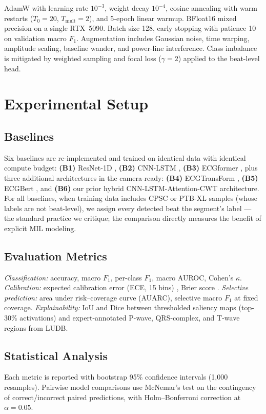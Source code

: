 \documentclass[conference]{IEEEtran}
\begin{document}
AdamW \cite{loshchilov2019} with learning rate $10^{-3}$, weight decay $10^{-4}$, cosine annealing with warm restarts ($T_0=20$, $T_{\text{mult}}=2$), and 5-epoch linear warmup. BFloat16 mixed precision on a single RTX~5090. Batch size 128, early stopping with patience 10 on validation macro $F_1$. Augmentation includes Gaussian noise, time warping, amplitude scaling, baseline wander, and power-line interference. Class imbalance is mitigated by weighted sampling and focal loss ($\gamma=2$) \cite{lin2017} applied to the beat-level head.

\section{Experimental Setup}

\subsection{Baselines}
Six baselines are re-implemented and trained on identical data with identical compute budget:
\textbf{(B1)} ResNet-1D \cite{hannun2019},
\textbf{(B2)} CNN-LSTM \cite{oh2018},
\textbf{(B3)} ECGformer \cite{ecgformer2024},
plus three additional architectures in the camera-ready: \textbf{(B4)} ECGTransForm \cite{ecgtransform2024}, \textbf{(B5)} ECGBert \cite{ecgbert2024}, and \textbf{(B6)} our prior hybrid CNN-LSTM-Attention-CWT architecture.
For all baselines, when training data includes CPSC or PTB-XL samples (whose labels are not beat-level), we assign every detected beat the segment's label --- the standard practice we critique; the comparison directly measures the benefit of explicit MIL modeling.

\subsection{Evaluation Metrics}
\textit{Classification:} accuracy, macro $F_1$, per-class $F_1$, macro AUROC, Cohen's $\kappa$.
\textit{Calibration:} expected calibration error (ECE, 15 bins) \cite{naeini2015}, Brier score \cite{brier1950}.
\textit{Selective prediction:} area under risk--coverage curve (AUARC), selective macro $F_1$ at fixed coverage.
\textit{Explainability:} IoU and Dice between thresholded saliency maps (top-30\% activations) and expert-annotated P-wave, QRS-complex, and T-wave regions from LUDB.

\subsection{Statistical Analysis}
Each metric is reported with bootstrap 95\% confidence intervals (1{,}000 resamples). Pairwise model comparisons use McNemar's test on the contingency of correct/incorrect paired predictions, with Holm--Bonferroni correction at $\alpha=0.05$.
\end{document}
